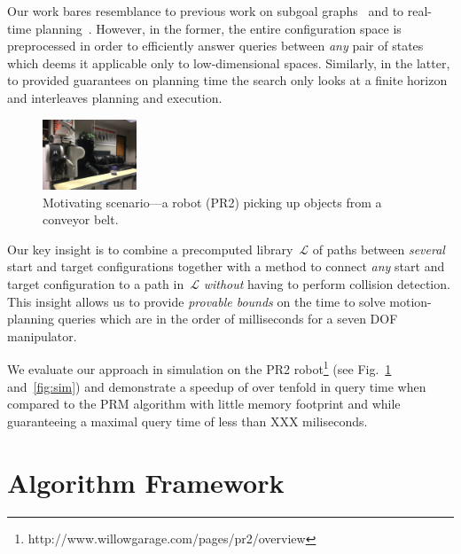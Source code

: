 \documentclass[letterpaper, 10 pt, conference]{ieeeconf}  %
\newcommand{\calL}{\ensuremath{\mathcal{L}}\xspace}
\begin{document}
Our work bares resemblance to previous work on 
subgoal graphs~\cite{UK17,UK18} and to real-time planning~\cite{KL06,KS09,K90}.
However, in the former, the entire configuration space is preprocessed in order to efficiently answer queries between \emph{any} pair of states which deems it applicable only to low-dimensional spaces.
Similarly, in the latter, to provided guarantees on planning time the search only looks at a finite horizon and interleaves planning and execution.

\begin{figure}[tb]
  \centering
    \includegraphics[width=0.25\textwidth]{PR2.jpg}
  \caption{
  Motivating scenario---a robot (PR2) picking up objects from a conveyor belt.
}
    \label{fig:PR2}
 \vspace{-6mm}
\end{figure}


Our key insight is to combine a precomputed library~$\calL$ of paths between \emph{several} start and target configurations together with a method to connect \emph{any} start and target configuration to a path in~$\calL$ \emph{without} having to perform collision detection.
This insight allows us to provide \emph{provable bounds} on the time to solve motion-planning queries which are in the order of milliseconds for a seven DOF manipulator.

We evaluate our approach in simulation on the PR2 robot\footnote{http://www.willowgarage.com/pages/pr2/overview} (see Fig.~\ref{fig:PR2} and~\ref{fig:sim})
and demonstrate a speedup of over tenfold in query time when compared to the \textsf{PRM} algorithm with little memory footprint and while guaranteeing a maximal query time of less than {\color{blue} XXX} miliseconds.


\section{Algorithm Framework}
\end{document}
